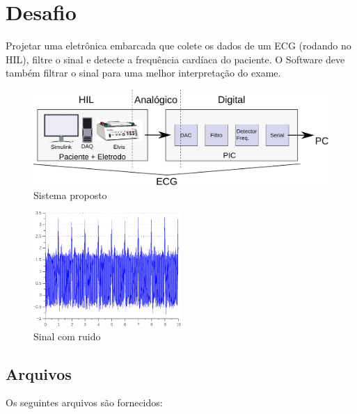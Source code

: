 \documentclass[11pt,a4paper]{scrartcl}
\begin{document}
\section{Desafio}

Projetar uma eletrônica embarcada que colete os dados de um ECG (rodando no HIL), filtre o sinal e detecte a frequência cardíaca do paciente. O Software deve também filtrar o sinal para uma melhor interpretação do exame.

\begin{figure}[!ht]
\centering
\includegraphics[width=1\textwidth]{figs/esquema.pdf}
\caption{Sistema proposto}
\label{fig:esquema}
\end{figure}

\begin{figure}[!ht]
\centering
\includegraphics[width=0.5\textwidth]{figs/ECG.pdf}
\caption{Sinal com ruido}
\label{fig:ruido}
\end{figure}

\subsection{Arquivos}

Os seguintes arquivos são fornecidos:
\end{document}
